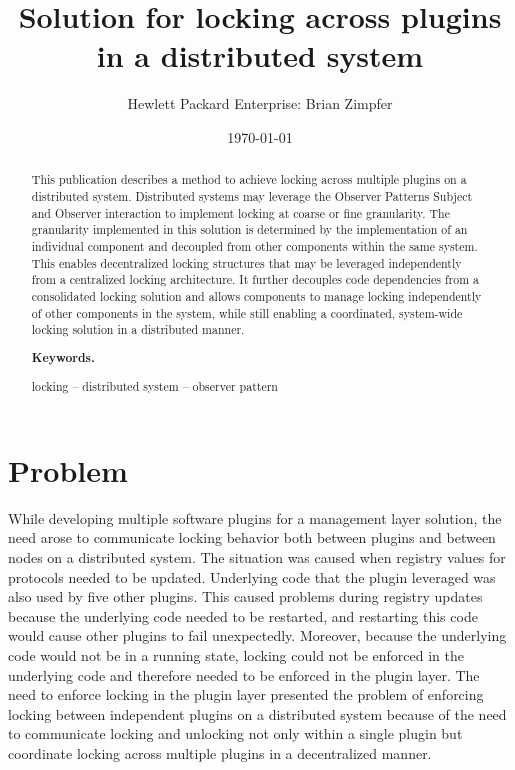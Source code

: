 \documentclass[12pt,english,a4paper,]{article}
\title{Solution for locking across plugins in a distributed system}
\author{Hewlett Packard Enterprise: Brian Zimpfer}
\date{\today}
\begin{document}
\maketitle
\begin{abstract}

This publication describes a method to achieve locking across multiple plugins on a distributed system.  Distributed systems may leverage the Observer Patterns Subject and Observer interaction to implement locking  at coarse or fine granularity.  The granularity implemented in this solution is determined by the implementation of an individual component and decoupled from other components within the same system.  This enables decentralized locking structures that may be leveraged independently from a centralized locking architecture.  It further decouples code dependencies from a consolidated locking solution and allows components to manage locking independently of other components in the system, while still enabling a coordinated, system-wide locking solution in a distributed manner.  

\bigskip
\noindent \textbf{Keywords.}

locking -- 
distributed system -- 
observer pattern  

\end{abstract}

\section{Problem}\label{problem}

While developing multiple software plugins  for a management layer solution, the need arose to communicate locking behavior both between plugins and between nodes on a distributed system.  The situation was caused when registry values for protocols needed to be updated.  Underlying code that the plugin leveraged was also used by five other plugins.  This caused problems during registry updates because the underlying code needed to be restarted, and restarting this code would cause other plugins to fail unexpectedly.  Moreover, because the underlying code would not be in a running state, locking could not be enforced in the underlying code and therefore needed to be enforced in the plugin layer. The need to enforce locking in the plugin layer presented the problem of enforcing locking between independent plugins on a distributed system because of the need to communicate locking and unlocking not only within a single plugin but coordinate locking across multiple plugins in a decentralized manner.   
\end{document}
